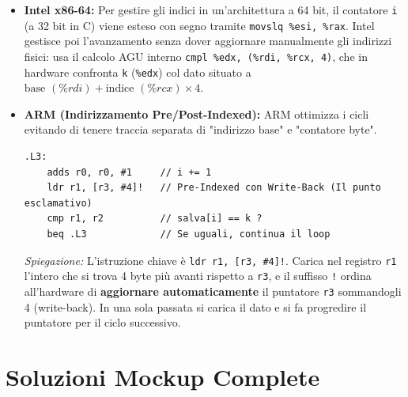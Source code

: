 \documentclass[12pt, a4paper]{article}
\begin{document}
\begin{itemize}
    \item \textbf{Intel x86-64:}
    Per gestire gli indici in un'architettura a 64 bit, il contatore \texttt{i} (a 32 bit in C) viene esteso con segno tramite \texttt{movslq \%esi, \%rax}. Intel gestisce poi l'avanzamento senza dover aggiornare manualmente gli indirizzi fisici: usa il calcolo AGU interno \texttt{cmpl \%edx, (\%rdi, \%rcx, 4)}, che in hardware confronta \texttt{k} (\texttt{\%edx}) col dato situato a $\text{base } (\%rdi) + \text{indice } (\%rcx) \times 4$.

    \item \textbf{ARM (Indirizzamento Pre/Post-Indexed):}
    ARM ottimizza i cicli evitando di tenere traccia separata di "indirizzo base" e "contatore byte".
\begin{verbatim}
.L3:
    adds r0, r0, #1     // i += 1
    ldr r1, [r3, #4]!   // Pre-Indexed con Write-Back (Il punto esclamativo)
    cmp r1, r2          // salva[i] == k ?
    beq .L3             // Se uguali, continua il loop
\end{verbatim}
    \textit{Spiegazione:} L'istruzione chiave è \texttt{ldr r1, [r3, \#4]!}. Carica nel registro \texttt{r1} l'intero che si trova 4 byte più avanti rispetto a \texttt{r3}, e il suffisso \texttt{!} ordina all'hardware di \textbf{aggiornare automaticamente} il puntatore \texttt{r3} sommandogli 4 (write-back). In una sola passata si carica il dato e si fa progredire il puntatore per il ciclo successivo.
\end{itemize}

\newpage

\section{Soluzioni Mockup Complete}
\end{document}
